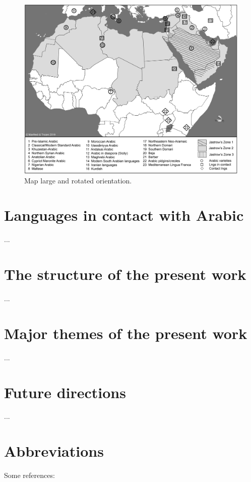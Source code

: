 \documentclass[output=paper]{langsci/langscibook}
\begin{document}
\begin{figure}
\includegraphics[height=.66\textheight, angle=90]{figures/Monde_arabe.jpg}
\caption{Map large and rotated orientation.}
\label{map}
\end{figure}


\section{Languages in contact with Arabic}
...

\section{The structure of the present work}
...

\section{Major themes of the present work}
...

\section{Future directions}
...

\section*{Abbreviations}

Some references:\\
\\
\citet{Jastrow2002}\\
\citet{Owens2000editor}\\
\citet{Owens2018}\\
\citet{Watson2011dialectsoverview}



\sloppy
\printbibliography[heading=subbibliography,notkeyword=this] 
\end{document}
